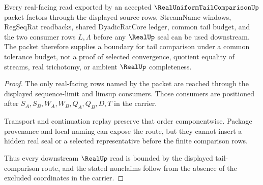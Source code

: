 \begin{theorem}
\label{thm:real-uniform-tail-comparison-real-seal-boundary}
Every real-facing read exported by an accepted $\RealUniformTailComparisonUp$ packet factors through the displayed source rows, StreamName windows, RegSeqRat readbacks, shared DyadicRatCore ledger, common tail budget, and the two consumer rows $L,\Lambda$ before any $\RealUp$ seal can be used downstream. The packet therefore supplies a boundary for tail comparison under a common tolerance budget, not a proof of selected convergence, quotient equality of streams, real trichotomy, or ambient $\RealUp$ completeness.
\end{theorem}
\begin{proof}
The only real-facing rows named by the packet are reached through the displayed sequence-limit and limsup consumers. Those consumers are positioned after $S_A,S_B,W_A,W_B,Q_A,Q_B,D,T$ in the carrier.

Transport and continuation replay preserve that order componentwise. Package provenance and local naming can expose the route, but they cannot insert a hidden real seal or a selected representative before the finite comparison rows.

Thus every downstream $\RealUp$ read is bounded by the displayed tail-comparison route, and the stated nonclaims follow from the absence of the excluded coordinates in the carrier.
\end{proof}


\begin{closurestatus}{\RealUniformTailComparisonUp}
  \theoryclosure{\seedClosure}
  \formalstatus{\unformalizedV}
\end{closurestatus}
